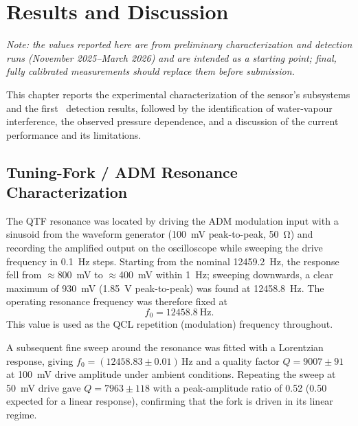 \chapter{Results and Discussion}
\label{ch:results}

\noindent\emph{Note: the values reported here are from preliminary
characterization and detection runs (November 2025--March 2026) and are intended
as a starting point; final, fully calibrated measurements should replace them
before submission.}\par\bigskip

This chapter reports the experimental characterization of the sensor's
subsystems and the first \nto\ detection results, followed by the identification
of water-vapour interference, the observed pressure dependence, and a discussion
of the current performance and its limitations.

\section{Tuning-Fork / ADM Resonance Characterization}
\label{sec:adm-char}

The QTF resonance was located by driving the ADM modulation input with a
sinusoid from the waveform generator (\SI{100}{\milli\volt} peak-to-peak,
\SI{50}{\ohm}) and recording the amplified output on the oscilloscope while
sweeping the drive frequency in \SI{0.1}{\hertz} steps. Starting from the nominal
\SI{12459.2}{\hertz}, the response fell from \(\approx\)\SI{800}{\milli\volt} to
\(\approx\)\SI{400}{\milli\volt} within \SI{1}{\hertz}; sweeping downwards, a
clear maximum of \SI{930}{\milli\volt} (\SI{1.85}{\volt} peak-to-peak) was found at
\SI{12458.8}{\hertz}. The operating resonance frequency was therefore fixed at
\begin{equation}
  \label{eq:f0}
  f_0 = \SI{12458.8}{\hertz}.
\end{equation}
This value is used as the QCL repetition (modulation) frequency throughout.

A subsequent fine sweep around the resonance was fitted with a Lorentzian
response, giving $f_0 = (12458.83 \pm 0.01)\,\si{\hertz}$ and a quality factor
$Q = 9007 \pm 91$ at \SI{100}{\milli\volt} drive amplitude under ambient
conditions. Repeating the sweep at \SI{50}{\milli\volt} drive gave
$Q = 7963 \pm 118$ with a peak-amplitude ratio of 0.52 (0.50 expected for a
linear response), confirming that the fork is driven in its linear regime.


